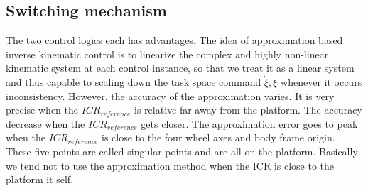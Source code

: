 \subsection{Switching mechanism}
\label{subsec:switching}
The two control logics each has advantages. 
The idea of approximation based inverse kinematic control is to linearize the complex and highly non-linear kinematic system at each control instance, so that we treat it as a linear system and thus capable to scaling down the task space command $\dot{\xi}, \ddot{\xi}$ whenever it occurs inconsistency. However, the accuracy of the approximation varies. It is very precise when the $ICR_{reference}$ is relative far away from the platform. The accuracy decrease when the  $ICR_{reference}$ gets closer. The approximation error goes to peak when the $ICR_{reference}$ is close to the four wheel axes and body frame origin. These five points are called singular points and are all on the platform. Basically we tend not to use the approximation method when the ICR is close to the platform it self.
